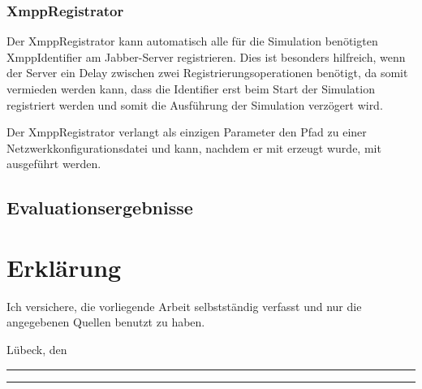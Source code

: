 \subsection{XmppRegistrator}
Der XmppRegistrator kann automatisch alle für die Simulation benötigten XmppIdentifier am Jabber-Server registrieren. Dies ist besonders hilfreich, wenn der Server ein Delay zwischen zwei Registrierungsoperationen benötigt, da somit vermieden werden kann, dass die Identifier erst beim Start der Simulation registriert werden und somit die Ausführung der Simulation verzögert wird.

Der XmppRegistrator verlangt als einzigen Parameter den Pfad zu einer Netzwerkkonfigurationsdatei und kann, nachdem er mit  erzeugt wurde, mit  ausgeführt werden.

\section{Evaluationsergebnisse}\label{sec:appendix_C}

\chapter*{Erklärung}
\thispagestyle{empty}
Ich versichere, die vorliegende Arbeit selbstständig verfasst und nur die
angegebenen Quellen benutzt zu haben.


\vspace*{5cm}
Lübeck, den \rule{0.3\textwidth}{0.4pt} \hspace*{1cm} \rule{0.3\textwidth}{0.4pt}